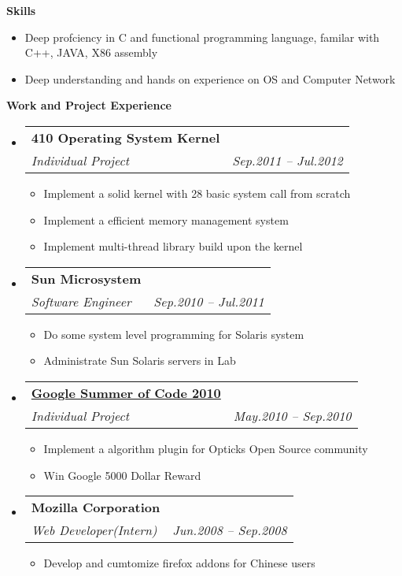 \documentclass[letterpaper,11pt]{article}
\makeatletter
\newcommand{\resitem}[1]{\item #1 \vspace{-2pt}}
\newcommand{\resheading}[1]{{\large \colorbox{mygrey}{\begin{minipage}{\textwidth}{\textbf{#1 \vphantom{p\^{E}}}}\end{minipage}}}}
\newcommand{\ressubheading}[4]{
\begin{tabular*}{6.5in}{l@{\extracolsep{\fill}}r}
		\textbf{#1} & #2 \\
		\textit{#3} & \textit{#4} \\
\end{tabular*}\vspace{-6pt}}
\makeatother
\begin{document}
\resheading{{Skills}}
      \begin{itemize}
					\item{\small Deep profciency in C and functional programming language, familar with C++, JAVA, X86 assembly}
					\item{\small Deep understanding and hands on experience on OS and Computer Network}
			\end{itemize}
\resheading{Work and Project Experience}
	\begin{itemize}
        \item 
			\ressubheading{410 Operating System Kernel}{}{Individual Project}{Sep.2011 -- Jul.2012}
            { \footnotesize
				\begin{itemize}
          \resitem{Implement a solid kernel with 28 basic system call from scratch}
					\resitem{Implement a efficient memory management system}
					\resitem{Implement multi-thread library build upon the kernel}
				\end{itemize}
			}
		\item 
			\ressubheading{Sun Microsystem}{}{Software Engineer}{Sep.2010 -- Jul.2011}
            { \footnotesize
				\begin{itemize}
					\resitem{Do some system level programming for Solaris system}
					\resitem{Administrate Sun Solaris servers in Lab}
				\end{itemize}
			}
		\item 
            \ressubheading{\href{http://code.google.com/soc/}{Google Summer of Code 2010}}{}{Individual Project}{May.2010 -- Sep.2010}
				{ \footnotesize
				\begin{itemize}
					\resitem{Implement a algorithm plugin for Opticks Open Source community}
                    \resitem{Win Google 5000 Dollar Reward}
				\end{itemize}
				}

		\item			
			\ressubheading{Mozilla Corporation}{}{Web Developer(Intern)}{Jun.2008 -- Sep.2008}
				{ \footnotesize				
				\begin{itemize}
					\item Develop and cumtomize firefox addons for Chinese users
				\end{itemize}
				}

	\end{itemize}  %
\end{document}
